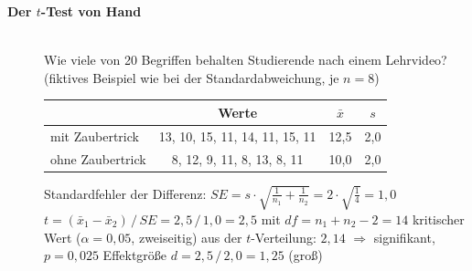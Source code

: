 \begin{description}
\item[{\rot\bf Der $t$-Test von Hand}]~\\
Wie viele von 20 Begriffen behalten Studierende nach einem Lehrvideo?
(fiktives Beispiel wie bei der Standardabweichung, je $n=8$)
\begin{center}
\small
\begin{tabular}{@{}lccc@{}}
\toprule
 & \textbf{Werte} & $\bar{x}$ & $s$ \\
\midrule
mit Zaubertrick & 13, 10, 15, 11, 14, 11, 15, 11 & 12{,}5 & 2{,}0 \\
ohne Zaubertrick & 8, 12, 9, 11, 8, 13, 8, 11 & 10{,}0 & 2{,}0 \\
\bottomrule
\end{tabular}
\end{center}
\bi
  \ite Standardfehler der Differenz:
    $\mathit{SE} = s\cdot\sqrt{\tfrac1{n_1}+\tfrac1{n_2}} = 2\cdot\sqrt{\tfrac14} = 1{,}0$
  \ite $t = (\bar{x}_1-\bar{x}_2)\,/\,\mathit{SE} = 2{,}5\,/\,1{,}0 = 2{,}5$
    mit $\mathit{df} = n_1+n_2-2 = 14$
  \ite kritischer Wert ($\alpha=0{,}05$, zweiseitig) aus der
    $t$-Verteilung: $2{,}14$ $\Rightarrow$ signifikant, $p = 0{,}025$
  \ite Effektgröße $d = 2{,}5\,/\,2{,}0 = 1{,}25$ (groß)
\ei
{}
\os{\newpage}


\end{description}

